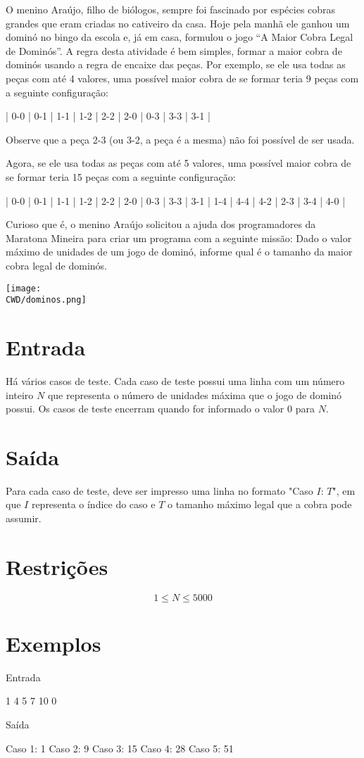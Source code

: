 O menino Araújo, filho de biólogos, sempre foi fascinado por espécies cobras grandes que eram criadas no cativeiro da casa. Hoje pela manhã ele ganhou um dominó no bingo da escola e, já em casa, formulou o jogo ``A Maior Cobra Legal de Dominós''. A regra desta atividade é bem simples, formar a maior cobra de dominós usando a regra de encaixe das peças. Por exemplo, se ele usa todas as peças com até 4 valores, uma possível maior cobra de se formar teria 9 peças com a seguinte configuração:

\begin{center}
  | 0-0 | 0-1 | 1-1 | 1-2 | 2-2 | 2-0 | 0-3 | 3-3 | 3-1 |
\end{center}

Observe que a peça 2-3 (ou 3-2, a peça é a mesma) não foi possível de ser usada.

Agora, se ele usa todas as peças com até 5 valores, uma possível maior cobra de se formar teria 15 peças com a seguinte configuração:

\begin{center}
  | 0-0 | 0-1 | 1-1 | 1-2 | 2-2 | 2-0 | 0-3 | 3-3 | 3-1 | 1-4 | 4-4 | 4-2 | 2-3 | 3-4 | 4-0 |
\end{center}

Curioso que é, o menino Araújo solicitou a ajuda dos programadores da Maratona Mineira para criar um programa com a seguinte missão: Dado o valor máximo de unidades de um jogo de dominó, informe qual é o tamanho da maior cobra legal de dominós.

\begin{center}
  \texttt{[image: \\CWD/dominos.png]}
\end{center}


\section*{Entrada}

Há vários casos de teste. Cada caso de teste possui uma linha com um número inteiro $N$ que representa o número de unidades máxima que o jogo de dominó possui. Os casos de teste encerram quando for informado o valor $0$ para $N$.

\section*{Saída}

Para cada caso de teste, deve ser impresso uma linha no formato "Caso $I$: $T$", em que $I$ representa o índice do caso e $T$ o tamanho máximo legal que a cobra pode assumir.

\section*{Restrições}

$$1 \leq N \leq 5000$$

\section*{Exemplos}

Entrada

1
4
5
7
10
0

Saída

Caso 1: 1
Caso 2: 9
Caso 3: 15
Caso 4: 28
Caso 5: 51

\exemplo
